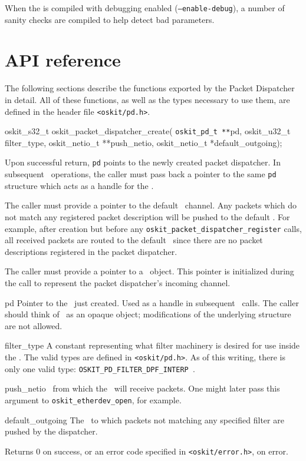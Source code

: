 When the \oskit{} is compiled with debugging enabled ({\tt --enable-debug}),
a number of sanity checks are compiled to help detect bad parameters. 

\section{API reference}

The following sections describe the functions exported by the Packet
Dispatcher in detail.
All of these functions, as well as the types necessary to use them,
are defined in the header file {\tt <oskit/pd.h>}.

%
%	

\begin{apisyn}

	\funcproto oskit_s32_t oskit_packet_dispatcher_create(
	{\tt oskit_pd_t **}pd, 
	oskit_u32_t filter_type, 
	oskit_netio_t **push_netio,
	oskit_netio_t *default_outgoing);
\end{apisyn}
\begin{apidesc}
	Upon successful
	return, {\tt pd} points to the newly created packet dispatcher.
	In subsequent \pd\ operations, the caller must pass back
	a pointer to the same {\tt pd} structure which acts as
 	a handle for the \pd.

	The caller must provide a pointer to the default  
	\netio\ channel. Any packets which do not match any 
	registered packet description will be pushed to the default
	\netio. For example, after creation but before any
	{\tt oskit_packet_dispatcher_register} calls, 
	all received packets are routed to the default \netio\ 
	since there are no 
	packet descriptions registered in the packet dispatcher.

	The caller must provide a pointer to a \netio\
	object. This pointer is initialized during the call to represent
	the packet dispatcher's incoming channel. 
\end{apidesc}
\begin{apiparm}
	\item[pd]
		Pointer to the \pd\ just created. Used as 
		a handle in subsequent \pd\ calls. The caller
		should think of \pd\ as an opaque object; 
		modifications of the underlying structure are
		not allowed. 
	\item[filter_type]
		A constant representing what 
		filter machinery is desired for use inside
		the \pd. The valid types are defined in 
		{\tt <oskit/pd.h>}. As of this writing, there
		is only one valid type: {\tt OSKIT_PD_FILTER_DPF_INTERP }.
	\item[push_netio]
		\netio\ from which the \pd\ will receive packets.
		One might later pass this argument
		to {\tt oskit_etherdev_open}, for example.
	\item[default_outgoing]
		The \netio\ to which packets not matching any
		specified filter are pushed by the dispatcher. 
\end{apiparm}
\begin{apiret}
	Returns 0 on success, or an error code specified in
	{\tt <oskit/error.h>}, on error.
\end{apiret}

